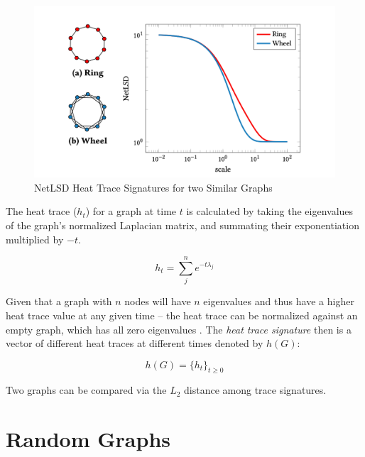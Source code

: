 \begin{singlespacing}
    \begin{figure}[H]
    \centering
    \includegraphics[scale=0.25]{Figures/heat_trace_ex}
    \caption[NetLSD Heat Trace Signatures for two Similar Graphs \cite{netlsd}]{NetLSD Heat Trace Signatures for two Similar Graphs \cite{netlsd}}
    \label{fig:heat_trace_ex}
    \end{figure}
\end{singlespacing}

The heat trace ($h_{t}$) for a graph at time $t$ is calculated by taking the
eigenvalues of the graph's normalized Laplacian matrix, and summating their
exponentiation multiplied by $-t$. 

\begin{equation}\label{equation:heat_trace}
    h_{t}=\sum_{j}^{n}e^{-t\lambda_{j}}
\end{equation}
 
Given that a graph with $n$ nodes will have $n$ eigenvalues and thus have a
higher heat trace value at any given time -- the heat trace can be normalized
against an empty graph, which has all zero eigenvalues \cite{netlsd}. The
\emph{heat trace signature} then is a vector of different heat traces at
different times denoted by $h(G)$:

\begin{equation}\label{equation:heat_trace_sig}
    h(G) = \{h_{t}\}_{t\geq0}
\end{equation}

Two graphs can be compared via the $L_{2}$ distance among trace signatures.

\section{Random Graphs}\label{sec:RandomGraphs}
    
